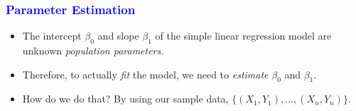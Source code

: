 \documentclass[12pt]{beamer}
\begin{document}
\begin{frame}
	\frametitle{\textcolor{blue}{Parameter Estimation}}
	
	\begin{itemize}[label={\color{blue}$\blacktriangleright$}]
		\item The intercept $\beta_0$ and slope $\beta_1$ of the simple linear regression model are unknown \textit{population parameters}.
		
		\item Therefore, to actually \textit{fit} the model, we need to \textit{estimate} $\beta_0$ and $\beta_1$.
		
		\item How do we do that? By using our sample data, $\{(X_1,Y_1),\ldots,(X_n,Y_n)\}$.
	\end{itemize}
	
\end{frame}
\end{document}
